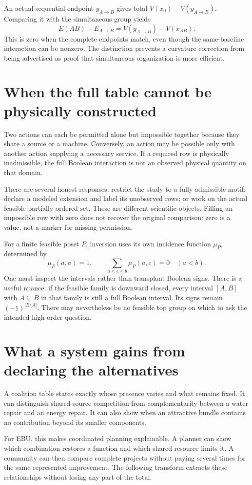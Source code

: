 An actual sequential endpoint $y_{A\to B}$ gives total $V(x_0)-V(y_{A\to B})$. Comparing it with the simultaneous group yields
\begin{equation}
 E(AB)-E_{A\to B}=V(y_{A\to B})-V(x_{AB}).
\end{equation}
This is zero when the complete endpoints match, even though the same-baseline interaction can be nonzero. The distinction prevents a curvature correction from being advertised as proof that simultaneous organization is more efficient.

\section{When the full table cannot be physically constructed}
Two actions can each be permitted alone but impossible together because they share a source or a machine. Conversely, an action may be possible only with another action supplying a necessary service. If a required row is physically inadmissible, the full Boolean interaction is not an observed physical quantity on that domain.

There are several honest responses: restrict the study to a fully admissible motif; declare a modeled extension and label its unobserved rows; or work on the actual feasible partially ordered set. These are different scientific objects. Filling an impossible row with zero does not recover the original comparison: zero is a value, not a marker for missing permission.

For a finite feasible poset $P$, inversion uses its own incidence function $\mu_P$, determined by
\begin{equation}
 \mu_P(a,a)=1,\qquad
 \sum_{a\leq c\leq b}\mu_P(a,c)=0\quad(a<b).
\end{equation}
One must inspect the intervals rather than transplant Boolean signs. There is a useful nuance: if the feasible family is downward closed, every interval $[A,B]$ with $A\subseteq B$ in that family is still a full Boolean interval. Its signs remain $(-1)^{|B\setminus A|}$. There may nevertheless be no feasible top group on which to ask the intended high-order question.

\section{What a system gains from declaring the alternatives}
A coalition table states exactly whose presence varies and what remains fixed. It can distinguish shared-source competition from complementarity between a water repair and an energy repair. It can also show when an attractive bundle contains no contribution beyond its smaller components.

For EBU, this makes coordinated planning explainable. A planner can show which combination restores a function and which shared resource limits it. A community can then compare complete projects without paying several times for the same represented improvement. The following transform extracts these relationships without losing any part of the total.
